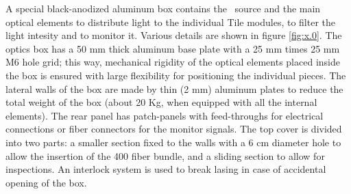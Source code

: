 A special black-anodized aluminum box contains the \laser~source and the main optical
elements to distribute light to the individual Tile modules, to filter the light
intesity and to monitor it. Various details are shown in figure \ref{fig:x.0}. The
optics box has a 50 mm thick aluminum base plate with a 25 mm times 25 mm M6 hole
grid; this way, mechanical rigidity of the optical elements 
placed inside the box is ensured with large flexibility for positioning the
individual pieces. The lateral walls of the box are made by thin (2 mm) aluminum
plates to
reduce the total weight of the box (about 20 Kg, when equipped with all the internal
elements). The rear panel has patch-panels with feed-throughs for electrical
connections or fiber connectors for the monitor signals. The top cover is divided
into two parts: a smaller section fixed to the walls with a 6 cm diameter hole to
allow the insertion of the 400 fiber bundle, and a sliding section to allow for
inspections.  An interlock system is used to break lasing in case of accidental
opening of the box. 
